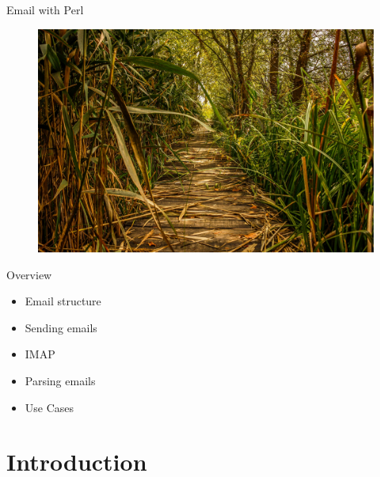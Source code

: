 \usepackage{minted}

\date{Nordic Perl Workshop 2018, Oslo, 6th September}


\maketitle

\begin{frame}
  \titlepage
\end{frame}

\cleardoublepage

\tableofcontents

\cleardoublepage


\begin{frame}{Email with Perl}
  \begin{figure}[!ht]
    \centering
    \includegraphics[width=0.9\linewidth]{img/swamp-1706114_1920.jpg}
  \end{figure}
\end{frame}



\begin{frame}{Overview}
  \begin{itemize}
  \item Email structure
  \item Sending emails
  \item IMAP
  \item Parsing emails
  \item Use Cases  
  \end{itemize}
\end{frame}

\section{Introduction}

